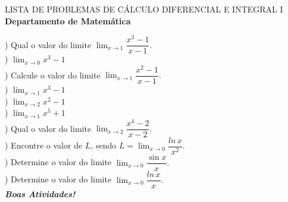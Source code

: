 \documentclass[12pt,a4paper]{article}
\begin{document}
\begin{center}
\large LISTA DE PROBLEMAS DE CÁLCULO DIFERENCIAL E INTEGRAL I\\
{\large\bf Departamento de Matemática}\\\end{center}

) Qual o valor do limite $\displaystyle\lim_{x\to 1}\dfrac{x^3-1}{x-1}.$\\
) $\lim_{x\to 0}x^3-1$\\
) Calcule o valor do limite $\displaystyle\lim_{x\to 1}\dfrac{x^2-1}{x-1}.$\\
) $\lim_{x\to 1}x^3-1$\\
) $\lim_{x\to 2}x^2-1$\\
) $\lim_{x\to 1}x^5+1$\\
) Qual o valor do limite $\displaystyle\lim_{x\to 2}\dfrac{x^4-2}{x-2}.$\\
) Encontre o valor de $L$, sendo $L=\displaystyle\lim_{x\to 0}\dfrac{ln\,x}{x^2}.$\\
) Determine o valor do limite $\displaystyle\lim_{x\to 0}\dfrac{\sin x}{x}.$\\
) Determine o valor do limite $\displaystyle\lim_{x\to 0}\dfrac{ln\,x}{x}.$\\
\vfill\hfill\bf{\textit{Boas Atividades!}}
\end{document}
